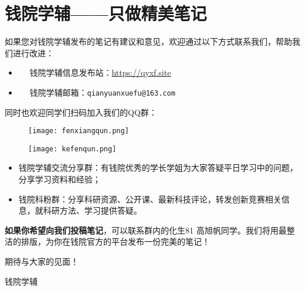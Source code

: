 \newpage
\chapter*{钱院学辅——只做精美笔记}

如果您对钱院学辅发布的笔记有建议和意见，欢迎通过以下方式联系我们，帮助我们进行改进：

\begin{itemize}
	\item \faInternetExplorer ~~ 钱院学辅信息发布站：\url{https://qyxf.site}
	\item \faEnvelopeOpen ~~ 钱院学辅邮箱：\texttt{qianyuanxuefu@163.com}
\end{itemize}

同时也欢迎同学们扫码加入我们的QQ群：

\begin{figure}[!ht]
	\centering
	\begin{minipage}[c]{0.45\textwidth}
		\centering
		\texttt{[image: fenxiangqun.png]}
	\end{minipage}%
	\quad
	\begin{minipage}[c]{0.45\textwidth}
		\centering
		\texttt{[image: kefenqun.png]}
	\end{minipage}
\end{figure}


\begin{itemize}
	\item 钱院学辅交流分享群：有钱院优秀的学长学姐为大家答疑平日学习中的问题，分享学习资料和经验；
	\item 钱院科粉群：分享科研资源、公开课、最新科技评论，转发创新竞赛相关信息，就科研方法、学习提供答疑。
\end{itemize}

\textbf{如果你希望向我们投稿笔记}，可以联系群内的化生81 高旭帆同学。我们将用最整洁的排版，为你在钱院官方的平台发布一份完美的笔记！

期待与大家的见面！

\begin{flushright}
	钱院学辅\\
	\zhtoday
\end{flushright}

